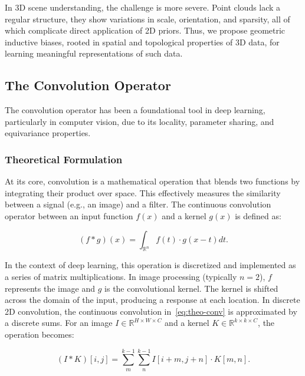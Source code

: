 In 3D scene understanding, the challenge is more severe.
%
Point clouds lack a regular structure, they show variations in scale,
orientation, and sparsity, all of which complicate direct application of 2D
priors.
%
Thus, we propose geometric inductive biases, rooted in spatial and topological
properties of 3D data, for learning meaningful representations of such data.

\subsection{The Convolution Operator}

The convolution operator has been a foundational tool in deep learning,
particularly in computer vision, due to its locality, parameter sharing, and
equivariance properties.

\subsubsection{Theoretical Formulation}

At its core, convolution is a mathematical operation that blends two functions
by integrating their product over space.
%
This effectively measures the similarity between a signal (e.g., an image) and
a filter.
%
The continuous convolution operator between an input function $f(x)$ and a
kernel $g(x)$ is defined as:

\begin{equation}\label{eq:theo-conv}
    (f * g)(x) = \int_{\mathbb{R}^n} f(t) \cdot g(x - t) dt.
\end{equation}

In the context of deep learning, this operation is discretized and implemented
as a series of matrix multiplications.
%
In image processing (typically $n = 2$), $f$ represents the image and $g$ is
the convolutional kernel.
%
The kernel is shifted across the domain of the input, producing a response at
each location.
%
In discrete 2D convolution, the continuous convolution in~\eqref{eq:theo-conv}
is approximated by a discrete sums. For an image $I \in \mathbb{R}^{H \times W
        \times C}$ and a kernel $K \in \mathbb{R}^{k \times k \times C}$, the operation
becomes:

\begin{equation}\label{eq:discrete-conv}
    (I * K)[i, j] = \sum_{m}^{k-1} \sum_{n}^{k-1} I[i + m, j + n] \cdot K[m,n].
\end{equation}

